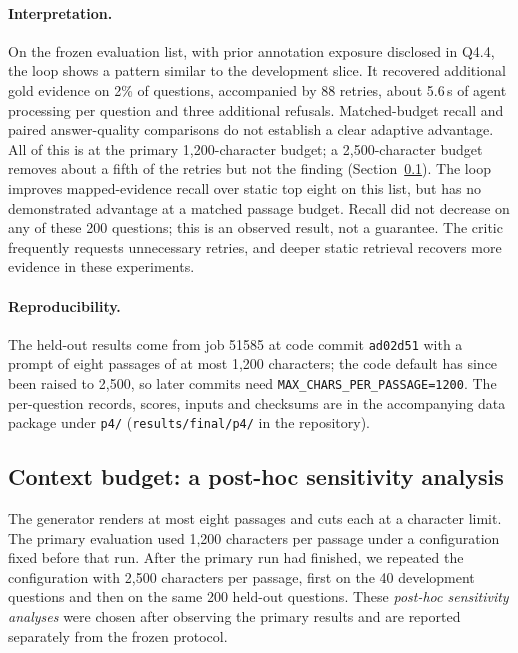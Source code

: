 \paragraph{Interpretation.}
On the frozen evaluation list, with prior annotation exposure disclosed in Q4.4, the loop shows a pattern similar to the development slice. It recovered additional gold evidence on 2\% of questions, accompanied by 88 retries, about 5.6\,s of agent processing per question and three additional refusals. Matched-budget recall and paired answer-quality comparisons do not establish a clear adaptive advantage. All of this is at the primary 1{,}200-character budget; a 2{,}500-character budget removes about a fifth of the retries but not the finding (Section~\ref{sec:context}). The loop improves mapped-evidence recall over static top eight on this list, but has no demonstrated advantage at a matched passage budget. Recall did not decrease on any of these 200 questions; this is an observed result, not a guarantee. The critic frequently requests unnecessary retries, and deeper static retrieval recovers more evidence in these experiments.

\paragraph{Reproducibility.} The held-out results come from job 51585 at code commit \texttt{ad02d51} with a prompt of eight passages of at most 1{,}200 characters; the code default has since been raised to 2{,}500, so later commits need \texttt{MAX\_CHARS\_PER\_PASSAGE=1200}. The per-question records, scores, inputs and checksums are in the accompanying data package under \texttt{p4/} (\texttt{results/final/p4/} in the repository).

\subsection{Context budget: a post-hoc sensitivity analysis}\label{sec:context}
The generator renders at most eight passages and cuts each at a character limit. The primary evaluation used 1{,}200 characters per passage under a configuration fixed before that run. After the primary run had finished, we repeated the configuration with 2{,}500 characters per passage, first on the 40 development questions and then on the same 200 held-out questions. These \emph{post-hoc sensitivity analyses} were chosen after observing the primary results and are reported separately from the frozen protocol.

